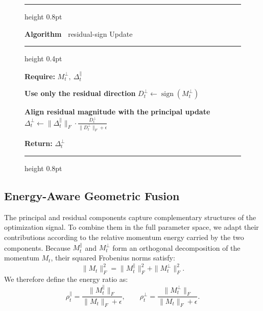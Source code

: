 \documentclass{article} %
\begin{document}
\begin{figure}
    \vspace{4pt}
    \hrule height 0.8pt

    \label{alg:resqadam-residual}

    \noindent
    \begin{minipage}[c][1.1\baselineskip][c]{\linewidth}
        \raggedright
        \textbf{Algorithm~\thealgorithm}  residual-sign Update
    \end{minipage}

    \hrule height 0.4pt
    \vspace{4pt}

    \begin{minipage}{0.53\columnwidth}
    \small
    \begin{algorithmic}

\State \textbf{Require:} $M_t^{\perp},\ \Delta_t^{\parallel}$

\State \textbf{Use only the residual direction}
\Statex \hspace{\algorithmicindent} $D_t^{\perp} \leftarrow \operatorname{sign}(M_t^{\perp})$

\State \textbf{Align residual magnitude with the}
\State \textbf{principal update}
\Statex \hspace{\algorithmicindent} $\Delta_t^{\perp} \leftarrow
\|\Delta_t^{\parallel}\|_F \cdot \frac{D_t^{\perp}}{\|D_t^{\perp}\|_F+\epsilon}$

\State \textbf{Return:} $\Delta_t^{\perp}$

\end{algorithmic}
    \end{minipage}

    \vspace{3pt}
    \hrule height 0.8pt
    \vspace{-2\baselineskip}
\end{figure}


\subsection{Energy-Aware Geometric Fusion}
\label{sec:energy_fusion}
The principal and residual components capture complementary structures of the optimization signal. To combine them in the full parameter space, we adapt their contributions according to the relative momentum energy carried by the two components.
Because $M_t^{\parallel}$ and $M_t^{\perp}$ form an orthogonal decomposition of the momentum $M_t$, their squared Frobenius norms satisfy:
\begin{equation}
\|M_t\|_F^2 = \|M_t^{\parallel}\|_F^2 + \|M_t^{\perp}\|_F^2 .
\end{equation}
We therefore define the energy ratio as:
\begin{equation}
\rho_t^{\parallel} = \frac{\|M_t^{\parallel}\|_F}{\|M_t\|_F+\epsilon}, \qquad
\rho_t^{\perp} = \frac{\|M_t^{\perp}\|_F}{\|M_t\|_F+\epsilon} .
\end{equation}
\end{document}
